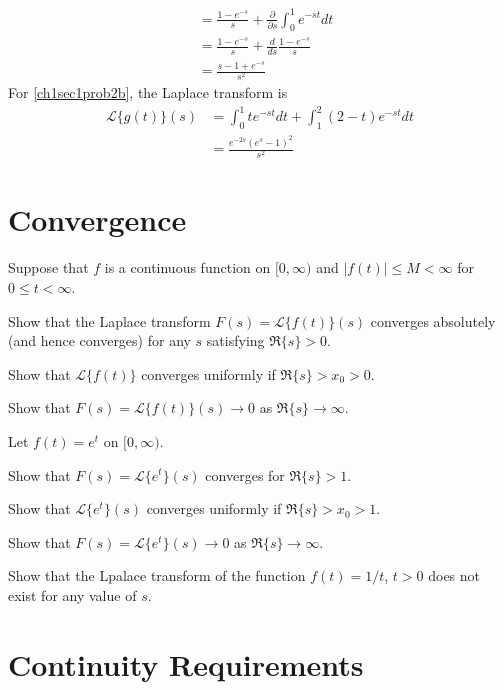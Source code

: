 \begin{exercise}
\begin{align*}
                           & = \frac{1 - e^{-s}}{s} +
                             \frac{\partial }{\partial s}\int_0^1e^{-st}dt\\
                           & = \frac{1 - e^{-s}}{s} + \frac{d}{ds}
                             \frac{1 - e^{-s}}{s}\\
                           & = \frac{s - 1 + e^{-s}}{s^2}
  \end{align*}
  For \cref{ch1sec1prob2b}, the Laplace transform is
  \begin{align*}
    \mathcal{L}\{g(t)\}(s) & = \int_0^1te^{-st}dt + \int_1^2(2 - t)e^{-st}dt\\
                           & = \frac{e^{-2s}(e^s - 1)^2}{s^2}
  \end{align*}
\end{exercise}

\section{Convergence}

\begin{exercise}
\item
  Suppose that \(f\) is a continuous function on \([0,\infty)\) and
  \(\lvert f(t)\rvert\leq M < \infty\) for \(0\leq t < \infty\).
  \begin{exercise}[label = (\alph*)]
  \item
    Show that the Laplace transform \(F(s) = \mathcal{L}\{f(t)\}(s)\) converges
    absolutely (and hence converges) for any \(s\) satisfying \(\Re\{s\} > 0\).
  \item
    Show that \(\mathcal{L}\{f(t)\}\) converges uniformly if
    \(\Re\{s\} > x_0 > 0\).
  \item
    Show that \(F(s) = \mathcal{L}\{f(t)\}(s)\to 0\) as \(\Re\{s\}\to\infty\).
  \end{exercise}
\item
  Let \(f(t) = e^t\) on \([0,\infty)\).
  \begin{exercise}[label = (\alph*)]
  \item
    Show that \(F(s) = \mathcal{L}\{e^t\}(s)\) converges for \(\Re\{s\} > 1\).
  \item
    Show that \(\mathcal{L}\{e^t\}(s)\) converges uniformly if
    \(\Re\{s\} > x_0 > 1\).
  \item
    Show that \(F(s) = \mathcal{L}\{e^t\}(s)\to 0\) as \(\Re\{s\}\to\infty\).
  \end{exercise}
\item
  Show that the Lpalace transform of the function \(f(t) = 1/t\), \(t > 0\)
  does not exist for any value of \(s\).
\end{exercise}

\section{Continuity Requirements}

\begin{exercise}
  \item
\end{exercise}
